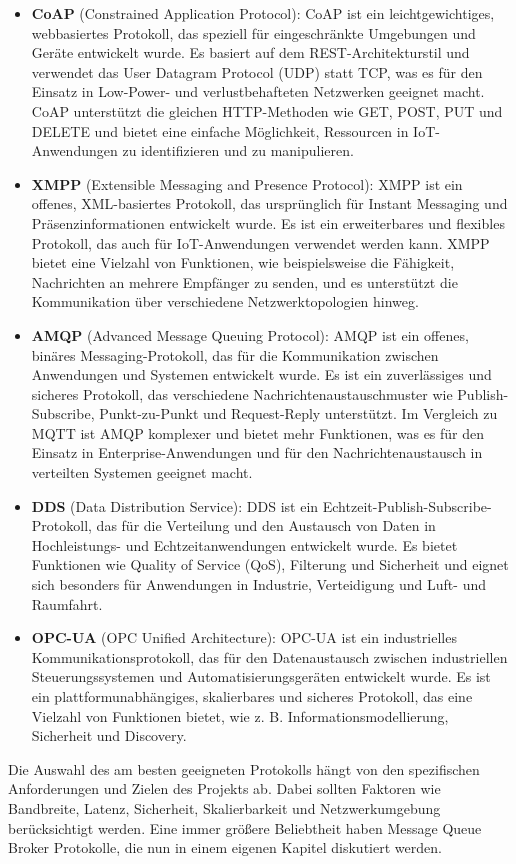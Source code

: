 \begin{itemize}
\item \textbf{CoAP} (Constrained Application Protocol): CoAP ist ein leichtgewichtiges, webbasiertes Protokoll, das speziell für eingeschränkte Umgebungen und Geräte entwickelt wurde. Es basiert auf dem REST-Architekturstil und verwendet das User Datagram Protocol (UDP) statt TCP, was es für den Einsatz in Low-Power- und verlustbehafteten Netzwerken geeignet macht. CoAP unterstützt die gleichen HTTP-Methoden wie GET, POST, PUT und DELETE und bietet eine einfache Möglichkeit, Ressourcen in IoT-Anwendungen zu identifizieren und zu manipulieren.
\item \textbf{XMPP} (Extensible Messaging and Presence Protocol): XMPP ist ein offenes, XML-basiertes Protokoll, das ursprünglich für Instant Messaging und Präsenzinformationen entwickelt wurde. Es ist ein erweiterbares und flexibles Protokoll, das auch für IoT-Anwendungen verwendet werden kann. XMPP bietet eine Vielzahl von Funktionen, wie beispielsweise die Fähigkeit, Nachrichten an mehrere Empfänger zu senden, und es unterstützt die Kommunikation über verschiedene Netzwerktopologien hinweg.
\item \textbf{AMQP} (Advanced Message Queuing Protocol): AMQP ist ein offenes, binäres Messaging-Protokoll, das für die Kommunikation zwischen Anwendungen und Systemen entwickelt wurde. Es ist ein zuverlässiges und sicheres Protokoll, das verschiedene Nachrichtenaustauschmuster wie Publish-Subscribe, Punkt-zu-Punkt und Request-Reply unterstützt. Im Vergleich zu MQTT ist AMQP komplexer und bietet mehr Funktionen, was es für den Einsatz in Enterprise-Anwendungen und für den Nachrichtenaustausch in verteilten Systemen geeignet macht.
\item \textbf{DDS} (Data Distribution Service): DDS ist ein Echtzeit-Publish-Subscribe-Protokoll, das für die Verteilung und den Austausch von Daten in Hochleistungs- und Echtzeitanwendungen entwickelt wurde. Es bietet Funktionen wie Quality of Service (QoS), Filterung und Sicherheit und eignet sich besonders für Anwendungen in Industrie, Verteidigung und Luft- und Raumfahrt.
\item \textbf{OPC-UA} (OPC Unified Architecture): OPC-UA ist ein industrielles Kommunikationsprotokoll, das für den Datenaustausch zwischen industriellen Steuerungssystemen und Automatisierungsgeräten entwickelt wurde. Es ist ein plattformunabhängiges, skalierbares und sicheres Protokoll, das eine Vielzahl von Funktionen bietet, wie z. B. Informationsmodellierung, Sicherheit und Discovery.
\end{itemize}
Die Auswahl des am besten geeigneten Protokolls hängt von den spezifischen Anforderungen und Zielen des Projekts ab. Dabei sollten Faktoren wie Bandbreite, Latenz, Sicherheit, Skalierbarkeit und Netzwerkumgebung berücksichtigt werden. Eine immer größere Beliebtheit haben Message Queue Broker Protokolle, die nun in einem eigenen Kapitel diskutiert werden.  

